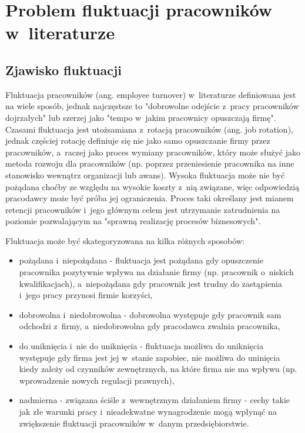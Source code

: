 

\chapter{Problem fluktuacji pracowników w~literaturze}\label{ch:knowladge-state}


\section{Zjawisko fluktuacji}\label{sec:zjawisko-fluktuacji}
Fluktuacja pracowników (ang. employee turnover) w~literaturze definiowana jest na wiele sposób, jednak najczęstsze to "dobrowolne odejście z~pracy pracowników dojrzałych"\cite{wozniak-2016}
lub szerzej jako "tempo w~jakim pracownicy opuszczają firmę"\cite{cron-2006}.
Czasami fluktuacja jest utożsamiana z~rotacją pracowników (ang. job rotation),
jednak częściej rotację definiuje się nie jako samo opuszczanie firmy przez pracowników, a~raczej jako proces wymiany pracowników,
który może służyć jako metoda rozwoju dla pracowników (np. poprzez przeniesienie pracownika na inne stanowisko wewnątrz organizacji lub awans)\cite{pocztowski-2009}.
Wysoka fluktuacja może nie być pożądana choćby ze względu na wysokie koszty z~nią związane\cite{philips-edwards-2009},
więc odpowiedzią pracodawcy może być próba jej ograniczenia.
Proces taki określany jest mianem retencji pracowników i~jego głównym celem jest utrzymanie zatrudnienia na poziomie pozwalającym na "sprawną realizację procesów biznesowych"\cite{pocztowski-2007}.

Fluktuacja może być skategoryzowana na kilka różnych sposobów\cite{spychala-2019}:
\begin{itemize}
    \item pożądana i~niepożądana - fluktuacja jest pożądana gdy opuszczenie pracownika pozytywnie wpływa na działanie firmy (np. pracownik o~niskich kwalifikacjach), a~niepożądana gdy pracownik jest trudny do zastąpienia i~jego pracy przynosi firmie korzyści,
    \item dobrowolna i~niedobrowolna - dobrowolna występuje gdy pracownik sam odchodzi z~firmy, a~niedobrowolna gdy pracodawca zwalnia pracownika,
    \item do uniknięcia i~nie do uniknięcia - fluktuacja możliwa do uniknięcia występuje gdy firma jest jej w~stanie zapobiec, nie możliwa do uninięcia kiedy zależy od czynników zewnętrznych, na które firma nie ma wpływu (np. wprowadzenie nowych regulacji prawnych),
    \item nadmierna - związana ściśle z~wewnętrznym działaniem firmy - cechy takie jak złe warunki pracy i~nieadekwatne wynagrodzenie mogą wpłynąć na zwiększenie fluktuacji pracowników w~danym przedsiębiorstwie.
\end{itemize}

